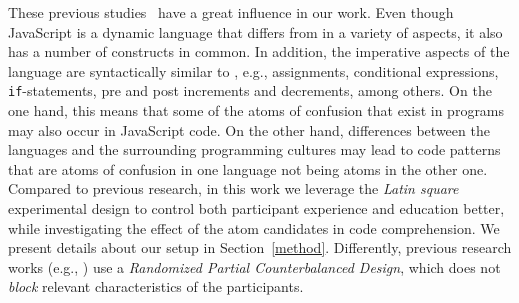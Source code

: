
These previous studies~\cite{DBLP:conf/sigsoft/GopsteinIYDZYC17,DBLP:conf/msr/GopsteinZFC18}
have a great influence in our work. Even though JavaScript is a dynamic language that differs from \clang in a variety of aspects, it also has a number of constructs in common. In addition, the imperative aspects of the language are syntactically similar to \clang, e.g., assignments, conditional expressions, \texttt{if}-statements, pre and post increments and decrements, among others. On the one hand, this means that some of the atoms of confusion that exist in \clang programs may also occur in JavaScript code. On the other hand, differences between the languages and the surrounding programming cultures may lead to code patterns that are atoms of confusion in one language not being atoms in the other one. Compared to previous research, in this work we leverage the \emph{Latin square} experimental design to control both participant experience and education better, while investigating the effect of the atom candidates in code comprehension. We present details about our setup in Section~\ref{method}. Differently, previous research works (e.g., \cite{DBLP:conf/sigsoft/GopsteinIYDZYC17,Langhout:2021:ACJ}) use a \emph{Randomized Partial Counterbalanced Design}, which does not \emph{block} relevant characteristics of the participants. 


